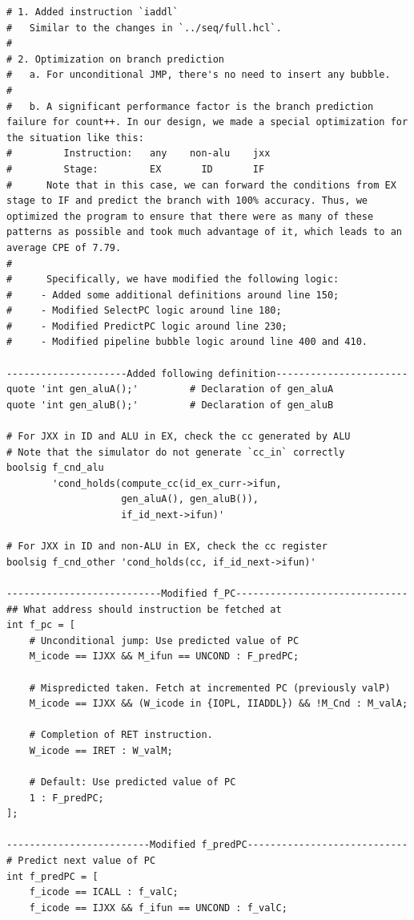 \documentclass[12pt,a4paper]{article}
\begin{document}
\begin{lstlisting} 
# 1. Added instruction `iaddl`
#   Similar to the changes in `../seq/full.hcl`.
#
# 2. Optimization on branch prediction
#   a. For unconditional JMP, there's no need to insert any bubble.
#
#   b. A significant performance factor is the branch prediction failure for count++. In our design, we made a special optimization for the situation like this:
#         Instruction:   any    non-alu    jxx
#         Stage:         EX       ID       IF
#      Note that in this case, we can forward the conditions from EX stage to IF and predict the branch with 100% accuracy. Thus, we optimized the program to ensure that there were as many of these patterns as possible and took much advantage of it, which leads to an average CPE of 7.79.
#
#      Specifically, we have modified the following logic:
#     - Added some additional definitions around line 150;
#     - Modified SelectPC logic around line 180;
#     - Modified PredictPC logic around line 230;
#     - Modified pipeline bubble logic around line 400 and 410.

---------------------Added following definition-----------------------
quote 'int gen_aluA();'			# Declaration of gen_aluA
quote 'int gen_aluB();'			# Declaration of gen_aluB

# For JXX in ID and ALU in EX, check the cc generated by ALU
# Note that the simulator do not generate `cc_in` correctly
boolsig f_cnd_alu 
        'cond_holds(compute_cc(id_ex_curr->ifun, 
                    gen_aluA(), gen_aluB()), 
                    if_id_next->ifun)'

# For JXX in ID and non-ALU in EX, check the cc register
boolsig f_cnd_other 'cond_holds(cc, if_id_next->ifun)'

---------------------------Modified f_PC------------------------------
## What address should instruction be fetched at
int f_pc = [
	# Unconditional jump: Use predicted value of PC
	M_icode == IJXX && M_ifun == UNCOND : F_predPC;

	# Mispredicted taken. Fetch at incremented PC (previously valP)
	M_icode == IJXX && (W_icode in {IOPL, IIADDL}) && !M_Cnd : M_valA;

	# Completion of RET instruction.
	W_icode == IRET : W_valM;

	# Default: Use predicted value of PC
	1 : F_predPC;
];

-------------------------Modified f_predPC----------------------------
# Predict next value of PC
int f_predPC = [
	f_icode == ICALL : f_valC;
	f_icode == IJXX && f_ifun == UNCOND : f_valC;


\end{lstlisting}
\end{document}

